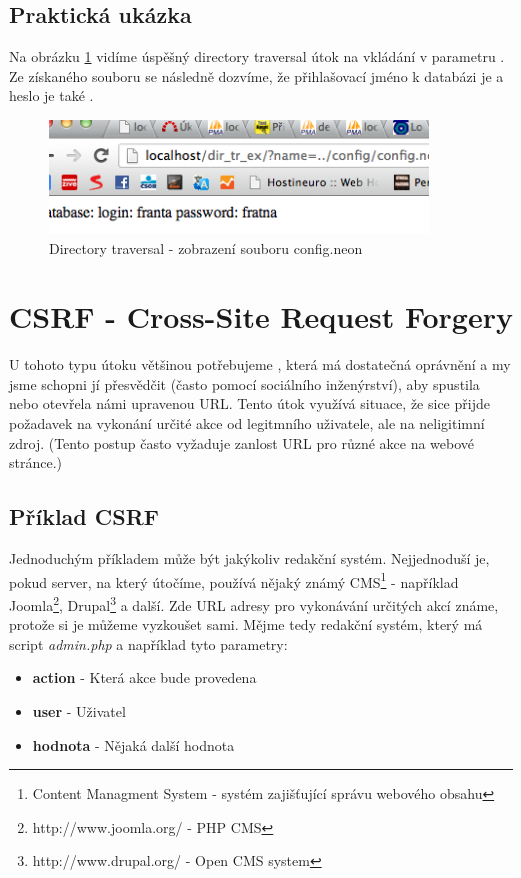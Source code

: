\documentclass[12pt, a4paper]{report}
\begin{document}
\subsection{Praktická ukázka}
Na obrázku \ref{obr.directory} vidíme úspěšný directory traversal útok na vkládání v parametru . Ze získaného souboru  se následně dozvíme, že přihlašovací jméno k databázi je  a heslo je také .
\begin{figure}[h!]
\centerline{\includegraphics[width=380px]{./examples/dir_example.png}}
\caption{Directory traversal - zobrazení souboru config.neon}
\label{obr.directory}
\end{figure}

\section{CSRF - Cross-Site Request Forgery}
U tohoto typu útoku většinou potřebujeme , která má dostatečná oprávnění a my jsme schopni jí přesvědčit (často pomocí sociálního inženýrství), aby spustila nebo otevřela námi upravenou URL. Tento útok využívá situace, že sice přijde požadavek na vykonání určité akce od legitmního uživatele, ale na neligitimní zdroj. (Tento postup často vyžaduje zanlost URL pro různé akce na webové stránce.)
\subsection{Příklad CSRF}
Jednoduchým příkladem může být jakýkoliv redakční systém. Nejjednoduší je, pokud server, na který útočíme, používá nějaký známý CMS\footnote{Content Managment System - systém zajišťující správu webového obsahu} - například Joomla\footnote{http://www.joomla.org/ - PHP CMS}, Drupal\footnote{http://www.drupal.org/ - Open CMS system} a další. Zde URL adresy pro vykonávání určitých akcí známe, protože si je můžeme vyzkoušet sami. Mějme tedy redakční systém, který má script \textit{admin.php} a například tyto parametry:
\begin{itemize}
\item \textbf{action} - Která akce bude provedena
\item \textbf{user} - Uživatel
\item \textbf{hodnota} - Nějaká další hodnota
\end{itemize}
\end{document}
